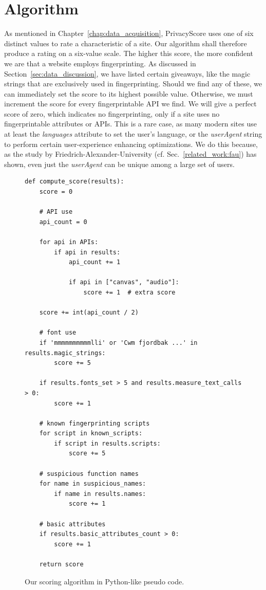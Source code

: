 \documentclass[
    fontsize=12pt,
    headings=small,
    parskip=half,
    bibliography=totoc,
    numbers=noenddot,
    open=any
    ]{scrreprt}
\begin{document}
\section{Algorithm}
As mentioned in Chapter~\ref{chap:data_acquisition}, PrivacyScore uses one of six distinct values
to rate a characteristic of a site. Our algorithm shall therefore produce a rating on a
six-value scale. The higher this score, the more confident we are that a website employs
fingerprinting. As discussed in Section~\ref{sec:data_discussion}, we have listed
certain giveaways, like the magic strings that are exclusively used in fingerprinting.
Should we find any of these, we can immediately set the score to its highest possible
value.
Otherwise, we must increment the score for every fingerprintable API we find.
We will give a perfect score of zero, which indicates no fingerprinting, only
if a site uses no fingerprintable attributes or APIs.
This is a rare case, as many modern sites use at least the \textit{languages}
attribute to set the user's language, or the \textit{userAgent} string to
perform certain user-experience enhancing optimizations.
We do this because, as the study by Friedrich-Alexander-University (cf. Sec.~\ref{related_work:fau})
has shown, even just the \textit{userAgent} can be unique among a large set of users.

\begin{figure}
\label{code:scoring_algorithm}
    \begin{verbatim}
def compute_score(results):
    score = 0

    # API use
    api_count = 0

    for api in APIs:
        if api in results:
            api_count += 1
            
            if api in ["canvas", "audio"]:
                score += 1  # extra score

    score += int(api_count / 2)

    # font use
    if 'mmmmmmmmmmlli' or 'Cwm fjordbak ...' in results.magic_strings:
        score += 5

    if results.fonts_set > 5 and results.measure_text_calls > 0:
        score += 1

    # known fingerprinting scripts
    for script in known_scripts:
        if script in results.scripts:
            score += 5

    # suspicious function names
    for name in suspicious_names:
        if name in results.names:
            score += 1

    # basic attributes
    if results.basic_attributes_count > 0:
        score += 1

    return score
\end{verbatim}
\caption{Our scoring algorithm in Python-like pseudo code.}
\end{figure}
\end{document}

